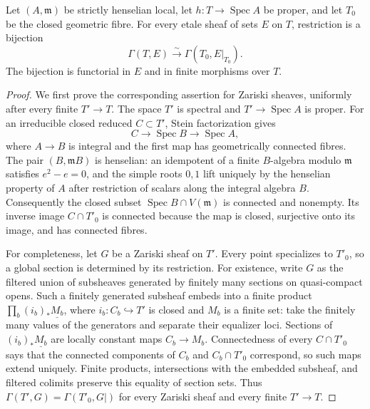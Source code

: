 \begin{lemma}
\label{lemma:weil-pbc-proper-strict-henselian-h0}
\uses{}

Let $(A,\mathfrak m)$ be strictly henselian local, let
$h:T\to\operatorname{Spec}A$ be proper, and let $T_0$ be the closed
geometric fibre.  For every etale sheaf of sets $E$ on $T$, restriction is a
bijection
\[
 \Gamma(T,E)\xrightarrow{\sim}\Gamma(T_0,E|_{T_0}).
\]
The bijection is functorial in $E$ and in finite morphisms over $T$.
\end{lemma}
\begin{proof}

We first prove the corresponding assertion for Zariski sheaves, uniformly
after every finite $T'\to T$.  The space $T'$ is spectral and $T'\to
\operatorname{Spec}A$ is proper.  For an irreducible closed reduced
$C\subset T'$, Stein factorization gives
\[
 C\longrightarrow\operatorname{Spec}B\longrightarrow
 \operatorname{Spec}A,
\]
where $A\to B$ is integral and the first map has geometrically connected
fibres.  The pair $(B,\mathfrak mB)$ is henselian: an idempotent of a finite
$B$-algebra modulo $\mathfrak m$ satisfies $e^2-e=0$, and the simple roots
$0,1$ lift uniquely by the henselian property of $A$ after restriction of
scalars along the integral algebra $B$.  Consequently the closed subset
$\operatorname{Spec}B\cap V(\mathfrak m)$ is connected and nonempty.  Its
inverse image $C\cap T'_0$ is connected because the map is closed,
surjective onto its image, and has connected fibres.

For completeness, let $G$ be a Zariski sheaf on $T'$.  Every point
specializes to $T'_0$, so a global section is determined by its restriction.
For existence, write $G$ as the filtered union of subsheaves generated by
finitely many sections on quasi-compact opens.  Such a finitely generated
subsheaf embeds into a finite product
\(\prod_b(i_b)_*\underline{M_b}\), where $i_b:C_b\hookrightarrow T'$ is
closed and $M_b$ is a finite set: take the finitely many values of the
generators and separate their equalizer loci.  Sections of
$(i_b)_*\underline{M_b}$ are locally constant maps $C_b\to M_b$.
Connectedness of every $C\cap T'_0$ says that the connected components of
$C_b$ and $C_b\cap T'_0$ correspond, so such maps extend uniquely.  Finite
products, intersections with the embedded subsheaf, and filtered colimits
preserve this equality of section sets.  Thus
\(\Gamma(T',G)=\Gamma(T'_0,G|)\) for every Zariski sheaf and every finite
$T'\to T$.


\end{proof}

